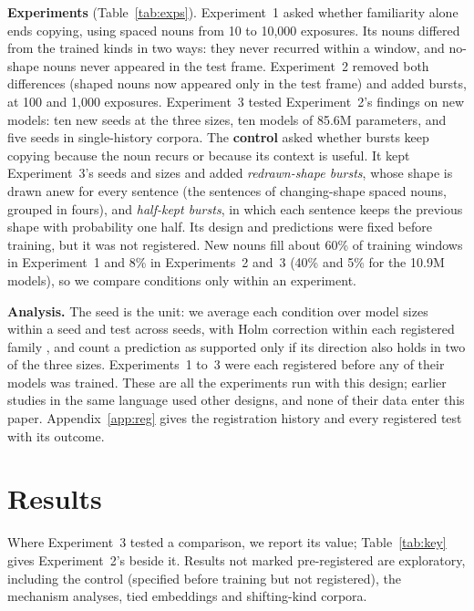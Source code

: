 \documentclass[11pt]{article}
\begin{document}
\textbf{Experiments} (Table~\ref{tab:exps}). Experiment~1 asked whether familiarity alone ends copying, using spaced nouns from 10 to 10,000 exposures. Its nouns differed from the trained kinds in two ways: they never recurred within a window, and no-shape nouns never appeared in the test frame. Experiment~2 removed both differences (shaped nouns now appeared only in the test frame) and added bursts, at 100 and 1,000 exposures. Experiment~3 tested Experiment~2's findings on new models: ten new seeds at the three sizes, ten models of 85.6M parameters, and five seeds in single-history corpora. The \textbf{control} asked whether bursts keep copying because the noun recurs or because its context is useful. It kept Experiment~3's seeds and sizes and added \emph{redrawn-shape bursts}, whose shape is drawn anew for every sentence (the sentences of changing-shape spaced nouns, grouped in fours), and \emph{half-kept bursts}, in which each sentence keeps the previous shape with probability one half. Its design and predictions were fixed before training, but it was not registered. New nouns fill about 60\% of training windows in Experiment~1 and 8\% in Experiments~2 and~3 (40\% and 5\% for the 10.9M models), so we compare conditions only within an experiment.

\textbf{Analysis.} The seed is the unit: we average each condition over model sizes within a seed and test across seeds, with Holm correction within each registered family \citep{holm1979}, and count a prediction as supported only if its direction also holds in two of the three sizes. Experiments~1 to~3 were each registered before any of their models was trained. These are all the experiments run with this design; earlier studies in the same language used other designs, and none of their data enter this paper. Appendix~\ref{app:reg} gives the registration history and every registered test with its outcome.

\section{Results}\label{sec:results}
Where Experiment~3 tested a comparison, we report its value; Table~\ref{tab:key} gives Experiment~2's beside it. Results not marked pre-registered are exploratory, including the control (specified before training but not registered), the mechanism analyses, tied embeddings and shifting-kind corpora.
\end{document}
